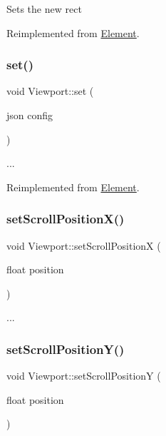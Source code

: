 Sets the new rect 

Reimplemented from \hyperlink{class_element_a9d78e1489e80f210a8f5cc9e5d5b07d3}{Element}.

\mbox{\label{class_viewport_a96703fae50a7a103da0a576c55fbdea5}} 
\subsubsection{\texorpdfstring{set()}{set()}}
{\footnotesize\ttfamily void Viewport\+::set (\begin{DoxyParamCaption}\item[{json}]{config }\end{DoxyParamCaption})\hspace{0.3cm}{\ttfamily [virtual]}}

... 

Reimplemented from \hyperlink{class_element_af89dcf0a470753cf1fecd8556a802c63}{Element}.

\mbox{\label{class_viewport_a6343db7258b534ee48e144f94af35e6e}} 
\subsubsection{\texorpdfstring{set\+Scroll\+Position\+X()}{setScrollPositionX()}}
{\footnotesize\ttfamily void Viewport\+::set\+Scroll\+PositionX (\begin{DoxyParamCaption}\item[{float}]{position }\end{DoxyParamCaption})}

... \mbox{\label{class_viewport_a48a9793ff0b244d0618355a32176c459}} 
\subsubsection{\texorpdfstring{set\+Scroll\+Position\+Y()}{setScrollPositionY()}}
{\footnotesize\ttfamily void Viewport\+::set\+Scroll\+PositionY (\begin{DoxyParamCaption}\item[{float}]{position }\end{DoxyParamCaption})}

